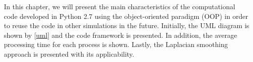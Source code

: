 In this chapter, we will present the main characteristics 
of the computational code developed in Python 2.7 \cite{python} 
using the object-oriented paradigm (OOP) in order to reuse the code 
in other simulations in the future. 
Initially, the UML diagram is shown by \ref{uml} and
the code framework is presented. In addition, the
average processing time for each process is shown.
Lastly, the Laplacian smoothing approach is presented
with its applicability.


